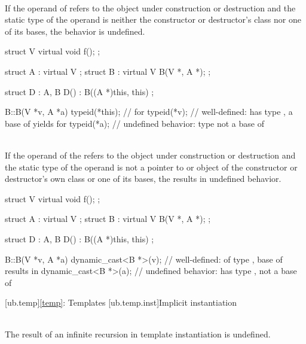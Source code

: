 \pnum
{} \\
If the operand of  refers to
the object under construction or destruction and the static type of the operand is neither the constructor or
destructor's class nor one of its bases, the behavior is undefined.

\pnum
\begin{example}
\begin{codeblock}
struct V {
  virtual void f();
};

struct A : virtual V {};
struct B : virtual V {
  B(V *, A *);
};

struct D : A, B {
  D() : B((A *)this, this) {}
};

B::B(V *v, A *a) {
  typeid(*this);        //  for 
  typeid(*v);           // well-defined:  has type , a base of  yields  for 
  typeid(*a);           // undefined behavior: type  not a base of 
}
\end{codeblock}
\end{example}


\pnum
{} \\
If the operand of the
 refers to the object under construction or destruction and the static type of the operand is
not a pointer to or object of the constructor or destructor's own class or one of its bases, the 
results in undefined behavior.

\pnum
\begin{example}
\begin{codeblock}
struct V {
  virtual void f();
};

struct A : virtual V {};
struct B : virtual V {
  B(V *, A *);
};

struct D : A, B {
  D() : B((A *)this, this) {}
};

B::B(V *v, A *a) {
  dynamic_cast<B *>(v); // well-defined:  of type ,  base of  results in 
  dynamic_cast<B *>(a); // undefined behavior:  has type ,  not a base of 
}
\end{codeblock}
\end{example}


[ub.temp]{\ref{temp}: Templates}
[ub.temp.inst]{Implicit instantiation}

\pnum
{} \\
The result of an infinite recursion in template instantiation is undefined.


